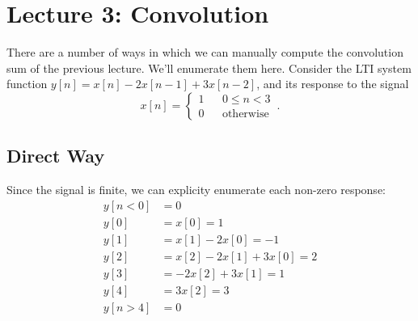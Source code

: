 \section{Lecture 3: Convolution}

There are a number of ways in which we can manually compute the convolution
sum of the previous lecture. We'll enumerate them here. Consider the LTI system
function $y[n] = x[n] - 2x[n-1] + 3x[n-2]$, and its response to the signal
%
\begin{displaymath}
  x[n] = \left\{\begin{array}{ccl}
  1 & & 0 \leq n < 3 \\
  0 & & \mathrm{otherwise}
  \end{array}\right. \,.
\end{displaymath}

\subsection{Direct Way}
%
Since the signal is finite, we can explicity enumerate each non-zero response:
%
\begin{align*}
  y[n<0] &= 0 \\
  y[0] &= x[0] = 1 \\
  y[1] &= x[1] - 2x[0] = -1 \\
  y[2] &= x[2] - 2x[1] + 3x[0] = 2 \\
  y[3] &= -2x[2] + 3x[1] = 1 \\
  y[4] &= 3x[2] = 3 \\
  y[n>4] &= 0
\end{align*}

